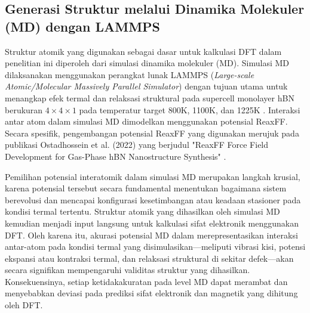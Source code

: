 \subsection{Generasi Struktur melalui Dinamika Molekuler (MD) dengan LAMMPS}
\label{subsec:md_lammps}
Struktur atomik yang digunakan sebagai dasar untuk kalkulasi DFT dalam penelitian ini diperoleh dari simulasi dinamika molekuler (MD). Simulasi MD dilaksanakan menggunakan perangkat lunak LAMMPS (\textit{Large-scale Atomic/Molecular Massively Parallel Simulator}) \cite{Plimpton1995} dengan tujuan utama untuk menangkap efek termal dan relaksasi struktural pada supercell monolayer hBN berukuran $4 \times 4 \times 1$ pada temperatur target 800K, 1100K, dan 1225K \cite{[1, 1]}. Interaksi antar atom dalam simulasi MD dimodelkan menggunakan potensial ReaxFF. Secara spesifik, pengembangan potensial ReaxFF yang digunakan merujuk pada publikasi Ostadhossein et al. (2022) yang berjudul "ReaxFF Force Field Development for Gas-Phase hBN Nanostructure Synthesis" \cite{Ostadhossein2022, [1]}.

Pemilihan potensial interatomik dalam simulasi MD merupakan langkah krusial, karena potensial tersebut secara fundamental menentukan bagaimana sistem berevolusi dan mencapai konfigurasi kesetimbangan atau keadaan stasioner pada kondisi termal tertentu. Struktur atomik yang dihasilkan oleh simulasi MD kemudian menjadi input langsung untuk kalkulasi sifat elektronik menggunakan DFT. Oleh karena itu, akurasi potensial MD dalam merepresentasikan interaksi antar-atom pada kondisi termal yang disimulasikan—meliputi vibrasi kisi, potensi ekspansi atau kontraksi termal, dan relaksasi struktural di sekitar defek—akan secara signifikan mempengaruhi validitas struktur yang dihasilkan. Konsekuensinya, setiap ketidakakuratan pada level MD dapat merambat dan menyebabkan deviasi pada prediksi sifat elektronik dan magnetik yang dihitung oleh DFT.

